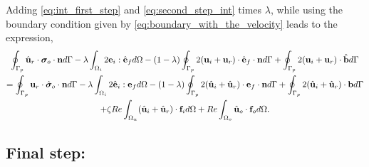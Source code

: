 Adding \ref{eq:int_first_step} and \ref{eq:second_step_int} times $\lambda$, while using the boundary condition given by \ref{eq:boundary_with_the_velocity} leads to the expression,
\begin{multline}
    \intS[p]{\hat{\textbf{u}}_{r} \cdot  \bm\sigma_{o}\cdot \textbf{n}}
    -\lambda \intO[i]{2\textbf{e}_i : \hat{\textbf{e}}_f}
    - (1-\lambda) \intS[p]{2(\textbf{u}_{i} + \textbf{u}_r)\cdot \hat{\textbf{e}}_f\cdot \textbf{n}}
    + \intS[p]{2(\textbf{u}_{i} + \textbf{u}_r)\cdot \hat{\textbf{b}}}
    \\
    =
    \intS[p]{\textbf{u}_{r}\cdot \hat{\bm\sigma}_{o}\cdot \textbf{n}}
    - \lambda \intO[i]{2\hat{\textbf{e}}_i :\textbf{e}_f}
    - (1-\lambda) \intS[p]{2(\hat{\textbf{u}}_{i} + \hat{\textbf{u}}_r) \cdot  \textbf{e}_f \cdot \textbf{n}}
    + \intS[p]{2(\hat{\textbf{u}}_{i} + \hat{\textbf{u}}_r) \cdot  \textbf{b}}
    \\ 
    + \zeta Re \intO{(\hat{\textbf{u}}_i+\hat{\textbf{u}}_r)\cdot \textbf{f}_{i}} 
    + Re\intO[o]{\hat{\textbf{u}}_{o}\cdot \textbf{f}_{o}}.
    \label{eq:int_third_step}
\end{multline}

\subsection{Final step:}

